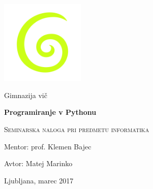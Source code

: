\documentclass[a4paper, 12pt]{article}
\begin{document}
    \begin{titlepage}
    	\centering
    	\includegraphics[width=0.3\textwidth]{gimvic_logo.png}\par
    	{\Large Gimnazija vič \par}
    	\vspace{1cm}
        {\huge\bfseries Programiranje v Pythonu\par}
    	\vspace{0.5cm}
        {\scshape\Large Seminarska naloga pri predmetu informatika\par}
    	\vspace{2cm}
        {\Large Mentor: prof. Klemen Bajec\par}
    	{\Large Avtor: Matej Marinko\par}
    	\vfill

    	{\large Ljubljana, marec 2017\par}
    \end{titlepage}


    \thispagestyle{empty}
    \newpage

    \begin{abstract}
    \noindent Namen naloge je izdelati program za steganografijo digitalnih fotografij. V prvem delu seminarske naloge je razloženo, kaj je steganografija in njeni primeri skozi čas. V nadaljevanju je še druga teorija, ki je pomembna za razumevanje in izdelavo programa. To so osnove zapisa sliku v računalniku, simetrična enkripcija enkripcija in programski jezik Python. Sledi praktični del naloge. Ker je celoten program razmeroma obsežen ter zato ni primerno, da bi bil natančno predstavljen v celoti, so podrobneje razložene samo nekateri njegovi pomembnejši deli. Namen seminarske naloge je bil dosežen, saj je bil napisan program za steganografijo slik, ki zadovoljivo deluje.
    \\

    \noindent \textbf{Ključne besede:} steganografija, kriptografija, programski jezik Python
    \end{abstract}


    \newpage
\end{document}
